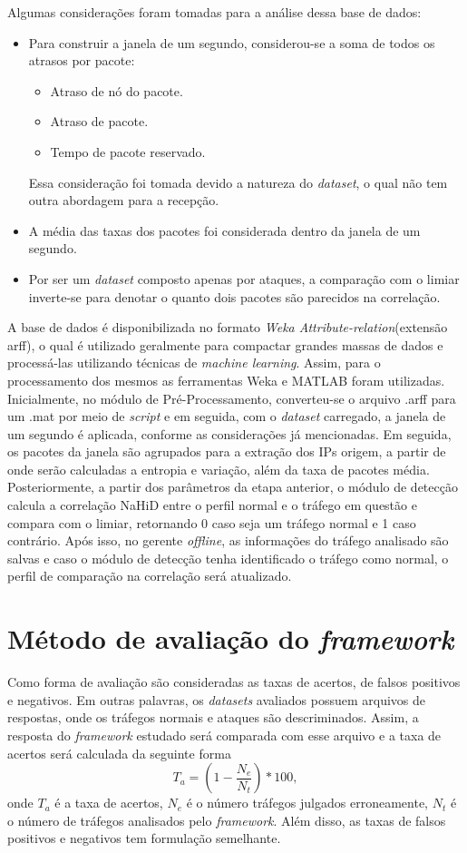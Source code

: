 Algumas considerações foram tomadas para a análise dessa base de dados:
\begin{itemize}
	\item Para construir a janela de um segundo, considerou-se a soma de todos os atrasos por pacote:
	\begin{itemize}
	 \item Atraso de nó do pacote.
	 \item  Atraso de pacote.
	 \item Tempo de pacote reservado.
	\end{itemize}
	Essa consideração foi tomada devido a natureza do \textit{dataset}, o qual não tem outra abordagem para a recepção.
	\item A média das taxas dos pacotes foi considerada dentro da janela de um segundo.
	\item Por ser um \textit{dataset} composto apenas por ataques, a comparação com o limiar inverte-se para denotar o quanto dois pacotes são parecidos na correlação.
\end{itemize}

A base de dados é disponibilizada no formato \textit{Weka Attribute-relation}(extensão arff), o qual é utilizado geralmente para compactar grandes massas de dados e processá-las utilizando técnicas de \textit{machine learning}. Assim, para o processamento dos mesmos as ferramentas Weka e MATLAB foram utilizadas. Inicialmente, no módulo de Pré-Processamento, converteu-se o arquivo .arff para um .mat por meio de \textit{script} e em seguida, com o \textit{dataset} carregado, a janela de um segundo é aplicada, conforme as considerações já mencionadas. Em seguida, os pacotes da janela são agrupados para a extração dos IPs origem, a partir de onde serão calculadas a entropia e  variação, além da taxa de pacotes média. Posteriormente, a partir dos parâmetros da etapa anterior, o módulo de detecção calcula a correlação NaHiD entre o perfil normal e o tráfego em questão e compara com o limiar, retornando 0 caso seja um tráfego normal e 1 caso contrário. Após isso, no gerente \textit{offline}, as informações do tráfego analisado são salvas e caso o módulo de detecção tenha identificado o tráfego como normal, o perfil de comparação na correlação será atualizado.
\section{Método de avaliação do \textit{framework}}
Como forma de avaliação são consideradas as taxas de acertos, de falsos positivos e negativos. Em outras palavras, os \textit{datasets} avaliados possuem arquivos de respostas, onde os tráfegos normais e ataques são descriminados. Assim, a resposta do \textit{framework} estudado será comparada com esse arquivo e a taxa de acertos será calculada da seguinte forma
\begin{equation}
T_a = \left(1 - \frac{N_e}{N_t}\right)* 100,
\end{equation}
onde $T_a$ é a taxa de acertos, $N_e$ é o número tráfegos julgados erroneamente, $N_t$ é o número de tráfegos analisados pelo \textit{framework}. Além disso, as taxas de falsos positivos e negativos tem formulação semelhante.